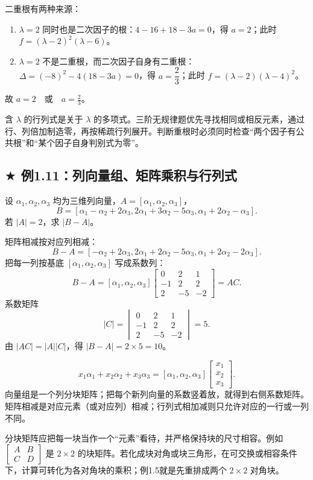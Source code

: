 \documentclass[UTF8,zihao=5,fontset=mac]{ctexart}
\newcommand{\mat}[1]{\begin{bmatrix}#1\end{bmatrix}}
\newcommand{\dmat}[1]{\begin{vmatrix}#1\end{vmatrix}}
\newcommand{\tagstar}{\textcolor{warm}{$\bigstar$}}
\begin{document}
二重根有两种来源：
\begin{enumerate}
  \item $\lambda=2$ 同时也是二次因子的根：$4-16+18-3a=0$，得 $a=2$；此时 $f=(\lambda-2)^2(\lambda-6)$。
  \item $\lambda=2$ 不是二重根，而二次因子自身有二重根：$\Delta=(-8)^2-4(18-3a)=0$，得 $a=\dfrac23$；此时 $f=(\lambda-2)(\lambda-4)^2$。
\end{enumerate}
故 $\boxed{a=2\quad\text{或}\quad a=\frac23}$。

\begin{summarybox}[分析]
含 $\lambda$ 的行列式是关于 $\lambda$ 的多项式。三阶无规律题优先寻找相同或相反元素，通过行、列倍加制造零，再按稀疏行列展开。判断重根时必须同时检查“两个因子有公共根”和“某个因子自身判别式为零”。
\end{summarybox}

\subsection{\texorpdfstring{\tagstar}{星标} 例1.11：列向量组、矩阵乘积与行列式}
\begin{problembox}[星标题]
设 $\alpha_1,\alpha_2,\alpha_3$ 均为三维列向量，$A=[\alpha_1,\alpha_2,\alpha_3]$，
\[
B=[\alpha_1-\alpha_2+2\alpha_3,
2\alpha_1+3\alpha_2-5\alpha_3,
\alpha_1+2\alpha_2-\alpha_3].
\]
若 $|A|=2$，求 $|B-A|$。
\end{problembox}

矩阵相减按对应列相减：
\[
B-A=[-\alpha_2+2\alpha_3,
2\alpha_1+2\alpha_2-5\alpha_3,
\alpha_1+2\alpha_2-2\alpha_3].
\]
把每一列按基底 $[\alpha_1,\alpha_2,\alpha_3]$ 写成系数列：
\[
B-A=[\alpha_1,\alpha_2,\alpha_3]
\mat{0&2&1\\-1&2&2\\2&-5&-2}=AC.
\]
系数矩阵
\[
|C|=\dmat{0&2&1\\-1&2&2\\2&-5&-2}=5.
\]
由 $|AC|=|A||C|$，得 $\boxed{|B-A|=2\times5=10}$。

\begin{summarybox}[补充：把线性组合写成矩阵乘积]
\[
x_1\alpha_1+x_2\alpha_2+x_3\alpha_3
=[\alpha_1,\alpha_2,\alpha_3]
\mat{x_1\\x_2\\x_3}.
\]
向量组是一个列分块矩阵；把每个新列向量的系数竖着放，就得到右侧系数矩阵。矩阵相减是对应元素（或对应列）相减；行列式相加减则只允许对应的一行或一列不同。
\end{summarybox}

\begin{summarybox}[补充：分块矩阵]
分块矩阵应把每一块当作一个“元素”看待，并严格保持块的尺寸相容。例如 $\begin{bmatrix}A&B\\C&D\end{bmatrix}$ 是 $2\times2$ 的块矩阵。若化成块对角或块三角形，在可交换或相容条件下，计算可转化为各对角块的乘积；例1.5就是先重排成两个 $2\times2$ 对角块。
\end{summarybox}
\end{document}
